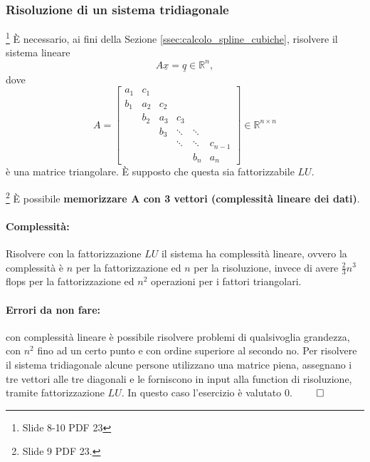 \subsubsection{Risoluzione di un sistema tridiagonale}\label{ssec:risoluzione_sistema_tridiagonale}
\footnote{Slide 8-10 PDF 23} È necessario, ai fini della Sezione \ref{ssec:calcolo_spline_cubiche}, risolvere il sistema lineare
\begin{equation}\label{eq:tridia}
	A\underline{x}=\underline{q}\in\mathbb{R}^n,
\end{equation}
dove
\begin{equation*}
	A=
	\begin{bmatrix}
		a_1 & c_1 & & & &\\
		b_1 & a_2 & c_2 & & &\\
		& b_2 & a_3 & c_3 & &\\
		& & b_3 &\ddots & \ddots &\\
		& & & \ddots & \ddots & c_{n-1}\\
		& & & &  b_n & a_n
	\end{bmatrix}
	\in\mathbb{R}^{n\times n}
\end{equation*}
è una matrice triangolare. È supposto che questa sia fattorizzabile $LU$.

\begin{remark}\footnote{Slide 9 PDF 23.}
	È possibile \textbf{memorizzare $\boldsymbol A$ con 3 vettori (complessità lineare dei dati)}.
\end{remark}

\paragraph{Complessità:} Risolvere con la fattorizzazione $LU$ il sistema ha complessità lineare, ovvero la complessità è $n$ per la fattorizzazione ed $n$ per la risoluzione, invece di avere $\frac{2}{3}n^3$ flops per la fattorizzazione ed $n^2$ operazioni per i fattori triangolari. 

\paragraph{Errori da non fare:} con complessità lineare è possibile risolvere problemi di qualsivoglia grandezza, con $n^2$ fino ad un certo punto e con ordine superiore al secondo no. Per risolvere il sistema tridiagonale alcune persone utilizzano una matrice piena, assegnano i tre vettori alle tre diagonali e le forniscono in input alla function di risoluzione, tramite fattorizzazione $LU$. In questo caso l'esercizio è valutato 0. $\qed$

